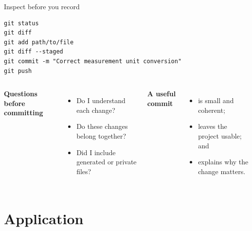 \documentclass[10pt,aspectratio=169]{beamer}
\begin{document}
\begin{frame}[fragile]{Inspect before you record}

\small

\begin{verbatim}
git status
git diff
git add path/to/file
git diff --staged
git commit -m "Correct measurement unit conversion"
git push
\end{verbatim}

\vspace{0.25cm}

\begin{columns}[T]

\textbf{Questions before committing}

\begin{itemize}
  \item Do I understand each change?
  \item Do these changes belong together?
  \item Did I include generated or private files?
\end{itemize}

\textbf{A useful commit}

\begin{itemize}
  \item is small and coherent;
  \item leaves the project usable; and
  \item explains why the change matters.
\end{itemize}

\end{columns}

\end{frame}


\section{Application}
\end{document}
